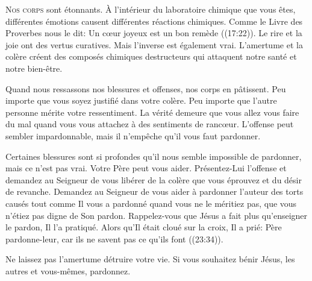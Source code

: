 \dvrule







\lettrine{N}{os corps} sont étonnants. À l'intérieur du laboratoire
 chimique que vous êtes, différentes émotions causent différentes
 réactions chimiques. Comme le Livre des Proverbes nous le dit: 
 \Og Un c\oe{}ur joyeux est un bon remède \Fg{} ((17:22)).
 Le rire et la joie ont des vertus curatives.
 Mais l'inverse est également vrai. L'amertume et la colère
 créent des composés chimiques destructeurs qui attaquent
 notre santé et notre bien-être.


Quand nous ressassons nos blessures et offenses, nos corps en pâtissent.
 Peu importe que vous soyez justifié dans votre colère.
 Peu importe que l'autre personne mérite votre ressentiment.
 La vérité demeure que vous allez vous faire du mal quand vous vous
 attachez à des sentiments de ranc\oe{}ur.
 L'offense peut sembler impardonnable,
 mais il n'empêche qu'il vous faut pardonner.

Certaines blessures sont si profondes qu'il nous semble impossible
 de pardonner, mais ce n'est pas vrai. Votre Père peut vous aider.
 Présentez-Lui  l'offense et demandez 
 au Seigneur de vous libérer de la colère que vous éprouvez
 et du désir de revanche. Demandez au Seigneur de vous aider à pardonner
 l'auteur des torts causés \ocadr tout comme Il vous a pardonné
 quand vous ne le méritiez pas, que vous n'étiez pas digne de Son pardon.
 Rappelez-vous que Jésus a fait plus qu'enseigner le pardon, Il l'a pratiqué.
 Alors qu'Il était cloué sur la croix, Il a prié: 
 \Og Père pardonne-leur, car ils ne savent pas ce qu'ils font \Fg{}
 ((23:34)).

Ne laissez pas l'amertume détruire votre vie.
 Si vous souhaitez bénir Jésus, les autres et vous-mêmes, pardonnez.

